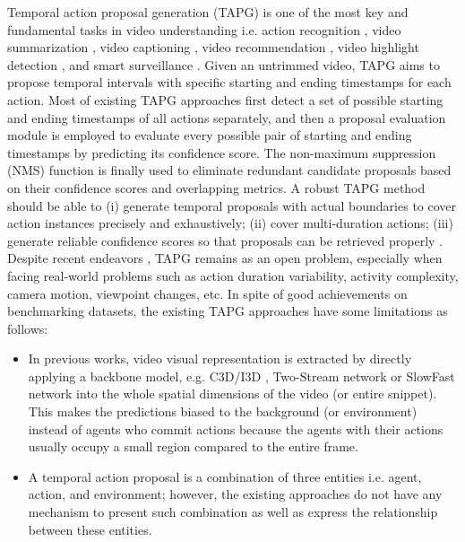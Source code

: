 \documentclass{ieeeaccess}
\begin{document}
Temporal action proposal generation (TAPG) \cite{SST_CVPR2017, CTAP, TCN, MSRA, actionproposal_2016, bmn, anchor_1, anchor_2, anchor_3, FasterR_CNN_Action, boundary_0, lin2018bsn, liu2019multi, dbg} is one of the most key and fundamental tasks in video understanding i.e.  action recognition \cite{2_stream_1, SlowFast}, video summarization \cite{summarization_2015, summarization_2016}, video captioning \cite{video_captioning_cvpr2020, captioning_2020}, video recommendation \cite{video_recommendation_1}, video highlight detection \cite{highlight_detection_CVPR19}, and smart surveillance \cite{smart_surveillance_1, smart_surveillance_2}. Given an untrimmed video, TAPG aims to propose temporal intervals with specific starting and ending timestamps for each action. Most of existing TAPG approaches first detect a set of possible starting and ending timestamps of all actions separately, and then a proposal evaluation module is employed to evaluate every possible pair of starting and ending timestamps by predicting its confidence score. The non-maximum suppression (NMS) function is finally used to eliminate redundant candidate proposals based on their confidence scores and overlapping metrics. A robust TAPG method should be able to (i) generate temporal proposals with actual boundaries to cover action instances precisely and exhaustively; (ii) cover multi-duration actions; (iii) generate reliable confidence scores so that proposals can be retrieved properly \cite{bmn}. Despite recent endeavors \cite{lin2018bsn, bmn, liu2019multi}, TAPG remains as an open problem, especially when facing real-world problems such as action duration variability, activity complexity, camera motion, viewpoint changes, etc.
In spite of good achievements on benchmarking datasets, the existing TAPG approaches have some limitations as follows:

\begin{itemize}
\item In previous works, video visual representation is extracted by directly applying a backbone model, e.g. C3D/I3D \mbox{\cite{C3D_3}}, Two-Stream network \mbox{\cite{2_stream_1, 2_stream_2}} or SlowFast network \mbox{\cite{SlowFast}} into the whole spatial dimensions of the video (or entire snippet). This makes the predictions biased to the background (or environment) instead of agents who commit actions because the agents with their actions usually occupy a small region compared to the entire frame.
\item A temporal action proposal is a combination of three entities i.e.  agent, action, and environment; however, the existing approaches do not have any mechanism to present such combination as well as express the relationship between these entities.
\end{itemize}
\end{document}
